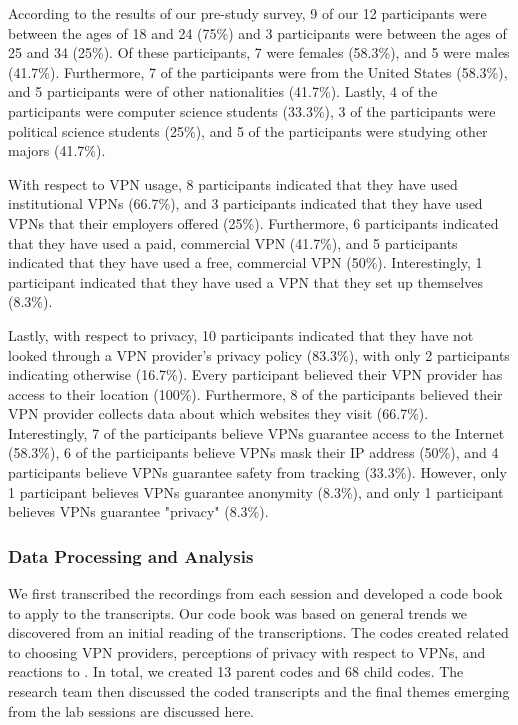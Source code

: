According to the results of our pre-study survey, 9 of our 12 participants were between the ages of 18 and 24 (75\%) and 3 participants were between the ages of 25 and 34 (25\%).
Of these participants, 7 were females (58.3\%), and 5 were males (41.7\%).
Furthermore, 7 of the participants were from the United States (58.3\%), and 5 participants were of other nationalities (41.7\%). 
Lastly, 4 of the participants were computer science students (33.3\%), 3 of the participants were political science students (25\%), and 5 of the participants were studying other majors (41.7\%).

With respect to VPN usage, 8 participants indicated that they have used institutional VPNs (66.7\%), and 3 participants indicated that they have used VPNs that their employers offered (25\%).
Furthermore, 6 participants indicated that they have used a paid, commercial VPN (41.7\%), and 5 participants indicated that they have used a free, commercial VPN (50\%).
Interestingly, 1 participant indicated that they have used a VPN that they set up themselves (8.3\%).

Lastly, with respect to privacy, 10 participants indicated that they have not looked through a VPN provider's privacy policy (83.3\%), with only 2 participants indicating otherwise (16.7\%).
Every participant believed their VPN provider has access to their location (100\%).
Furthermore, 8 of the participants believed their VPN provider collects data about which websites they visit (66.7\%).
Interestingly, 7 of the participants believe VPNs guarantee access to the Internet (58.3\%), 6 of the participants believe VPNs mask their IP address (50\%), and 4 participants believe VPNs guarantee safety from tracking (33.3\%).
However, only 1 participant believes VPNs guarantee anonymity (8.3\%), and only 1 participant believes VPNs guarantee "privacy" (8.3\%).

\subsubsection{Data Processing and Analysis}
We first transcribed the recordings from each session and developed a code book to apply to the transcripts.
Our code book was based on general trends we discovered from an initial reading of the transcriptions.
The codes created related to choosing VPN providers, perceptions of privacy with respect to VPNs, and reactions to \tool.
In total, we created 13 parent codes and 68 child codes.  The research team then discussed the coded transcripts and the final themes emerging from the lab sessions are discussed here.

